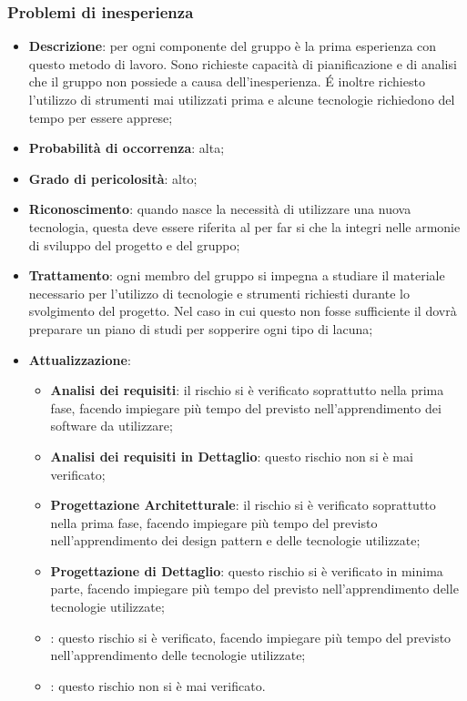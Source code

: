 		\subsubsection{Problemi di inesperienza}
		\begin{itemize}
			\item \textbf{Descrizione}: per ogni componente del gruppo è la prima esperienza con questo metodo di lavoro. Sono richieste capacità di pianificazione e di analisi che il gruppo non possiede a causa dell'inesperienza. \'E inoltre richiesto l'utilizzo di strumenti mai utilizzati prima e alcune tecnologie richiedono del tempo per essere apprese;
			\item \textbf{Probabilità di occorrenza}: alta;
			\item \textbf{Grado di pericolosità}: alto;
			\item \textbf{Riconoscimento}: quando nasce la necessità di utilizzare una nuova tecnologia, questa deve essere riferita al \textit{\Res} per far si che la integri nelle armonie di sviluppo del progetto e del gruppo; 
			\item \textbf{Trattamento}: ogni  membro del gruppo si impegna a studiare il materiale necessario per l'utilizzo di tecnologie e strumenti richiesti durante lo svolgimento del progetto. Nel caso in cui questo non fosse sufficiente il \textit{\Res} dovrà preparare un piano di studi per sopperire ogni tipo di lacuna;	
			\item \textbf{Attualizzazione}:
			\begin{itemize}
				\item \textbf{Analisi dei requisiti}: il rischio si è verificato soprattutto nella prima fase, facendo impiegare più tempo del previsto nell'apprendimento dei software da utilizzare;
				\item \textbf{Analisi dei requisiti in Dettaglio}: questo rischio non si è mai verificato;
				\item \textbf{Progettazione Architetturale}: il rischio si è verificato soprattutto nella prima fase, facendo impiegare più tempo del previsto nell'apprendimento dei design pattern e delle tecnologie utilizzate; 
				\item \textbf{Progettazione di Dettaglio}: questo rischio si è verificato in minima parte, facendo impiegare più tempo del previsto nell'apprendimento delle tecnologie utilizzate;
				\item \textbf{\CO}: questo rischio si è verificato, facendo impiegare più tempo del previsto nell'apprendimento delle tecnologie utilizzate;
				\item \textbf{\VV}: questo rischio non si è mai verificato.
			\end{itemize}
		\end{itemize}
	
